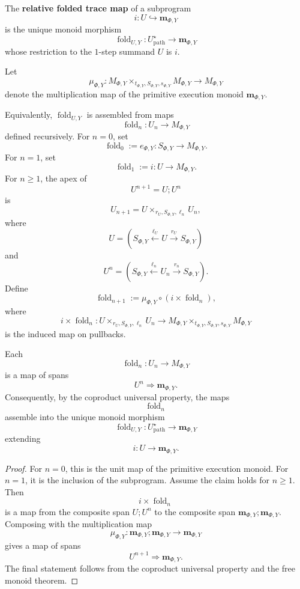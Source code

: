 \begin{definition}
\label{def:relative-folded-trace-map}
The \textbf{relative folded trace map} of a subprogram
\[
i:U\hookrightarrow \mathbf m_{\Phi,Y}
\]
is the unique monoid morphism
\[
\operatorname{fold}_{U,Y}:
U^\star_{\mathrm{path}}\to\mathbf m_{\Phi,Y}
\]
whose restriction to the \(1\)-step summand \(U\) is \(i\).
\end{definition}

Let
\[
\mu_{\Phi,Y}:
M_{\Phi,Y}\times_{t_{\Phi,Y},S_{\Phi,Y},s_{\Phi,Y}}M_{\Phi,Y}
\to
M_{\Phi,Y}
\]
denote the multiplication map of the primitive execution monoid
\(\mathbf m_{\Phi,Y}\).

Equivalently, \(\operatorname{fold}_{U,Y}\) is assembled from maps
\[
\operatorname{fold}_n:U_n\to M_{\Phi,Y}
\]
defined recursively. For \(n=0\), set
\[
\operatorname{fold}_0:=e_{\Phi,Y}:S_{\Phi,Y}\to M_{\Phi,Y}.
\]
For \(n=1\), set
\[
\operatorname{fold}_1:=i:U\to M_{\Phi,Y}.
\]
For \(n\ge1\), the apex of
\[
U^{n+1}=U;U^n
\]
is
\[
U_{n+1}
=
U\times_{r_U,S_{\Phi,Y},\ell_n}U_n,
\]
where
\[
U=
(S_{\Phi,Y}\xleftarrow{\ell_U}U\xrightarrow{r_U}S_{\Phi,Y})
\]
and
\[
U^n=
(S_{\Phi,Y}\xleftarrow{\ell_n}U_n\xrightarrow{r_n}S_{\Phi,Y}).
\]
Define
\[
\operatorname{fold}_{n+1}
:=
\mu_{\Phi,Y}\circ(i\times\operatorname{fold}_n),
\]
where
\[
i\times\operatorname{fold}_n:
U\times_{r_U,S_{\Phi,Y},\ell_n}U_n
\to
M_{\Phi,Y}\times_{t_{\Phi,Y},S_{\Phi,Y},s_{\Phi,Y}}M_{\Phi,Y}
\]
is the induced map on pullbacks.

\begin{proposition}
\label{prop:relative-fold-maps-span-maps}
Each
\[
\operatorname{fold}_n:U_n\to M_{\Phi,Y}
\]
is a map of spans
\[
U^n\Rightarrow \mathbf m_{\Phi,Y}.
\]
Consequently, by the coproduct universal property, the maps
\[
\operatorname{fold}_n
\]
assemble into the unique monoid morphism
\[
\operatorname{fold}_{U,Y}:
U^\star_{\mathrm{path}}\to\mathbf m_{\Phi,Y}
\]
extending
\[
i:U\to\mathbf m_{\Phi,Y}.
\]
\end{proposition}

\begin{proof}
For \(n=0\), this is the unit map of the primitive execution monoid. For
\(n=1\), it is the inclusion of the subprogram. Assume the claim holds for
\(n\ge1\). Then
\[
i\times\operatorname{fold}_n
\]
is a map from the composite span \(U;U^n\) to the composite span
\(\mathbf m_{\Phi,Y};\mathbf m_{\Phi,Y}\). Composing with the multiplication
map
\[
\mu_{\Phi,Y}:
\mathbf m_{\Phi,Y};\mathbf m_{\Phi,Y}\to\mathbf m_{\Phi,Y}
\]
gives a map of spans
\[
U^{n+1}\Rightarrow \mathbf m_{\Phi,Y}.
\]
The final statement follows from the coproduct universal property and the free
monoid theorem.
\end{proof}


